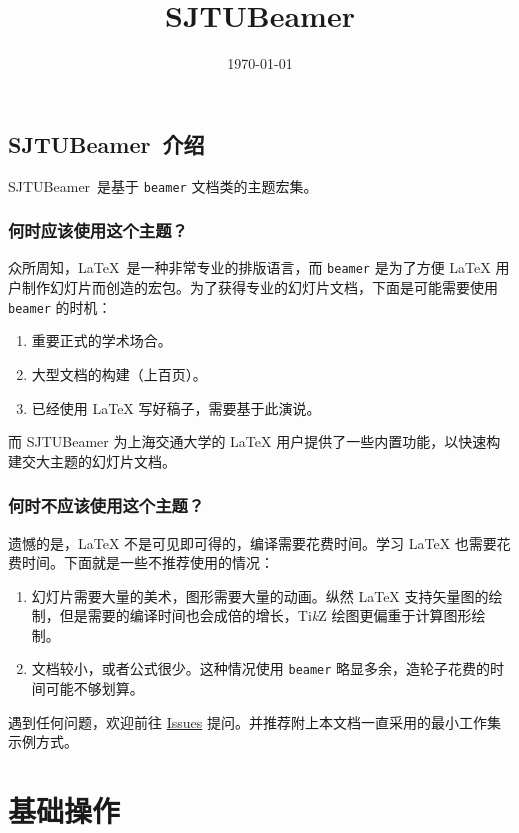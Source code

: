 \documentclass[
    UTF8,
    heading=true,
    12pt,
    a4paper
]{ctexrep}
\newcommand{\cls}[1]{\texttt{#1}}
\def\themename{\textsf{SJTUBeamer}}
\begin{document}
\title{\themename}
\date{\today}

\chapter*{\themename\ 介绍}

\themename\ 是基于 \verb"beamer" 文档类的主题宏集。

\section*{何时应该使用这个主题？}
众所周知，\LaTeX\ 是一种非常专业的排版语言，而 \cls{beamer} 是为了方便 \LaTeX{} 用户制作幻灯片而创造的宏包。为了获得专业的幻灯片文档，下面是可能需要使用 \cls{beamer} 的时机：
\begin{enumerate}
  \item 重要正式的学术场合。
  \item 大型文档的构建（上百页）。
  \item 已经使用 \LaTeX{} 写好稿子，需要基于此演说。
\end{enumerate}

而 \themename{} 为上海交通大学的 \LaTeX{} 用户提供了一些内置功能，以快速构建交大主题的幻灯片文档。

\section*{何时不应该使用这个主题？}
遗憾的是，\LaTeX{} 不是可见即可得的，编译需要花费时间。学习 \LaTeX{} 也需要花费时间。下面就是一些不推荐使用的情况：
\begin{enumerate}
  \item 幻灯片需要大量的美术，图形需要大量的动画。纵然 \LaTeX{} 支持矢量图的绘制，但是需要的编译时间也会成倍的增长，Ti\emph{k}Z 绘图更偏重于计算图形绘制。
  \item 文档较小，或者公式很少。这种情况使用 \cls{beamer} 略显多余，造轮子花费的时间可能不够划算。
\end{enumerate}

遇到任何问题，欢迎前往 \href{https://github.com/sjtug/SJTUBeamer/issues}{Issues} 提问。并推荐附上本文档一直采用的最小工作集示例方式。

\setcounter{tocdepth}{0}
\tableofcontents

\part{基础操作}
\end{document}
